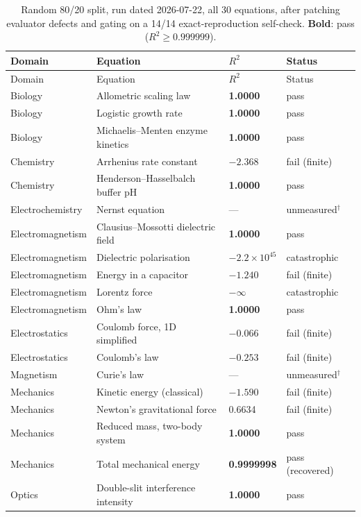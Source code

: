 \documentclass[twoside,11pt]{article}
\newcommand{\Rsq}{R^{2}}
\begin{document}
\begin{longtable}{p{2.3cm}p{6.3cm}p{1.4cm}p{2.5cm}}
\caption{Random 80/20 split, run dated 2026-07-22, all 30 equations, after
  patching evaluator defects and gating on a 14/14 exact-reproduction
  self-check. \textbf{Bold}: pass ($\Rsq \geq 0.999999$).}
\label{tab:randomsplit}\\
\toprule
Domain & Equation & $\Rsq$ & Status \\
\midrule
\endfirsthead
\toprule
Domain & Equation & $\Rsq$ & Status \\
\midrule
\endhead
Biology & Allometric scaling law & \textbf{1.0000} & pass \\
Biology & Logistic growth rate & \textbf{1.0000} & pass \\
Biology & Michaelis--Menten enzyme kinetics & \textbf{1.0000} & pass \\
Chemistry & Arrhenius rate constant & $-2.368$ & fail (finite) \\
Chemistry & Henderson--Hasselbalch buffer pH & \textbf{1.0000} & pass \\
Electrochemistry & Nernst equation & --- & unmeasured$^\dagger$ \\
Electromagnetism & Clausius--Mossotti dielectric field & \textbf{1.0000} & pass \\
Electromagnetism & Dielectric polarisation & $-2.2\times10^{45}$ & catastrophic \\
Electromagnetism & Energy in a capacitor & $-1.240$ & fail (finite) \\
Electromagnetism & Lorentz force & $-\infty$ & catastrophic \\
Electromagnetism & Ohm's law & \textbf{1.0000} & pass \\
Electrostatics & Coulomb force, 1D simplified & $-0.066$ & fail (finite) \\
Electrostatics & Coulomb's law & $-0.253$ & fail (finite) \\
Magnetism & Curie's law & --- & unmeasured$^\dagger$ \\
Mechanics & Kinetic energy (classical) & $-1.590$ & fail (finite) \\
Mechanics & Newton's gravitational force & 0.6634 & fail (finite) \\
Mechanics & Reduced mass, two-body system & \textbf{1.0000} & pass \\
Mechanics & Total mechanical energy & \textbf{0.9999998} & pass (recovered) \\
Optics & Double-slit interference intensity & \textbf{1.0000} & pass \\

\end{longtable}
\end{document}
